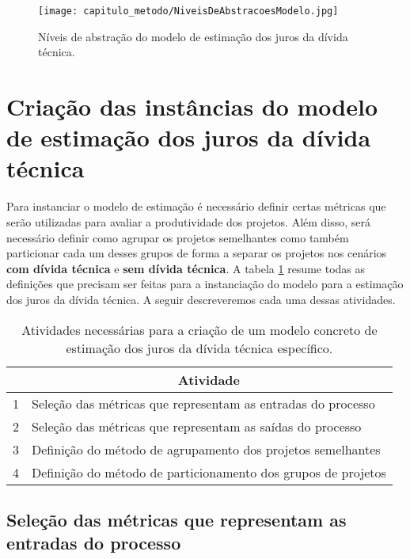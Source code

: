   \begin{figure}[H]
  \centering
  \texttt{[image: capitulo\_metodo/NiveisDeAbstracoesModelo.jpg]} 
  \caption{Níveis de abstração do modelo de estimação dos juros da dívida técnica. }
  \label{fig:cap_metodo_niveis_abstracao} 
\end{figure}


 
 \section{Criação das instâncias do modelo de estimação dos juros da dívida técnica}
  
Para instanciar o modelo de estimação é necessário definir certas métricas que serão utilizadas para avaliar a produtividade dos projetos. Além disso, será necessário definir como agrupar os projetos semelhantes como também particionar cada um desses grupos de forma a separar os projetos nos cenários \textbf{com dívida técnica} e \textbf{sem dívida técnica}. A tabela \ref{cap_modelo_tabela_resumo_passos} resume todas as definições que precisam ser feitas para a instanciação do modelo para a estimação dos juros da dívida técnica.  A seguir descreveremos cada uma dessas atividades.
 
 
 \begin{table}[H]
 \centering
\caption{Atividades necessárias para a criação de um modelo concreto de estimação dos juros da dívida técnica específico.}
\label{cap_modelo_tabela_resumo_passos}
\begin{tabular}{l|l}
\hline
 & \multicolumn{1}{c}{Atividade}                                \\ \hline
1  & Seleção das métricas que representam as entradas do processo  \\ \hline
2  & Seleção das métricas que representam as saídas do processo    \\ \hline
3  & Definição do método de agrupamento dos projetos semelhantes   \\ \hline
4  & Definição do método de particionamento dos grupos de projetos \\ \hline
\end{tabular}
\end{table}


\subsection{Seleção das métricas que representam as entradas do processo}

